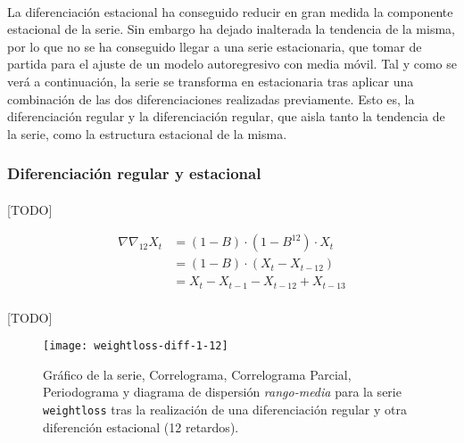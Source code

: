 \documentclass[a4paper, spanish]{article}
\begin{document}
        \paragraph{}
        La diferenciación estacional ha conseguido reducir en gran medida la componente estacional de la serie. Sin embargo ha dejado inalterada la tendencia de la misma, por lo que no se ha conseguido llegar a una serie estacionaria, que tomar de partida para el ajuste de un modelo autoregresivo con media móvil. Tal y como se verá a continuación, la serie se transforma en estacionaria tras aplicar una combinación de las dos diferenciaciones realizadas previamente. Esto es, la diferenciación regular y la diferenciación regular, que aisla tanto la tendencia de la serie, como la estructura estacional de la misma.

      \subsubsection{Diferenciación regular y estacional}
      \label{sec:regular_seasonal_difference}

        \paragraph{}
        [TODO]

        \begin{equation}
          \begin{split}
            \nabla \nabla_{12} X_t
            &= (1 - B) \cdot (1 - B^{12}) \cdot X_t \\
            &= (1 - B) \cdot (X_t - X_{t - 12}) \\
            &= X_t - X_{t - 1} - X_{t - 12} + X_{t - 13}
          \end{split}
        \end{equation}

        \paragraph{}
        [TODO]

        \begin{figure}[htb!]
          \texttt{[image: weightloss-diff-1-12]}
          \caption{Gráfico de la serie, Correlograma, Correlograma Parcial, Periodograma y diagrama de dispersión \emph{rango-media} para la serie \texttt{weightloss} tras la realización de una diferenciación regular y otra diferención estacional (12 retardos).}
          \label{img:weightloss_diff_1_12}
        \end{figure}
\end{document}
